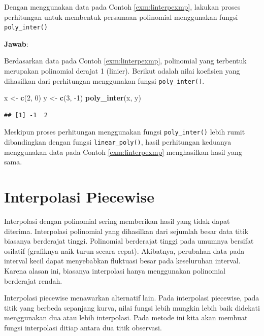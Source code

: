 \documentclass[]{book}
\newenvironment{Shaded}{\begin{snugshade}}{\end{snugshade}}
\newcommand{\DecValTok}[1]{\textcolor[rgb]{0.00,0.00,0.81}{#1}}
\newcommand{\KeywordTok}[1]{\textcolor[rgb]{0.13,0.29,0.53}{\textbf{#1}}}
\newcommand{\NormalTok}[1]{#1}
\newcommand{\StringTok}[1]{\textcolor[rgb]{0.31,0.60,0.02}{#1}}
\theoremstyle{definition}
\theoremstyle{definition}
\theoremstyle{definition}
\theoremstyle{remark}
\let\BeginKnitrBlock\begin \let\EndKnitrBlock\end
\begin{document}
\BeginKnitrBlock{example}
\protect\hypertarget{exm:hopoliexmp2}{}{\label{exm:hopoliexmp2} }Dengan menggunakan data pada Contoh \ref{exm:linterpexmp}, lakukan proses perhitungan untuk membentuk persamaan polinomial menggunakan fungsi \texttt{poly\_inter()}
\EndKnitrBlock{example}

\textbf{Jawab}:

Berdasarkan data pada Contoh \ref{exm:linterpexmp}, polinomial yang terbentuk merupakan polinomial derajat 1 (linier). Berikut adalah nilai koefisien yang dihasilkan dari perhitungan menggunakan fungsi \texttt{poly\_inter()}.

\begin{Shaded}
\begin{Highlighting}[]
\NormalTok{x <-}\StringTok{ }\KeywordTok{c}\NormalTok{(}\DecValTok{2}\NormalTok{, }\DecValTok{0}\NormalTok{)}
\NormalTok{y <-}\StringTok{ }\KeywordTok{c}\NormalTok{(}\DecValTok{3}\NormalTok{, }\DecValTok{-1}\NormalTok{)}
\KeywordTok{poly_inter}\NormalTok{(x, y)}
\end{Highlighting}
\end{Shaded}

\begin{verbatim}
## [1] -1  2
\end{verbatim}

Meskipun proses perhitungan menggunakan fungsi \texttt{poly\_inter()} lebih rumit dibandingkan dengan fungsi \texttt{linear\_poly()}, hasil perhitungan keduanya menggunakan data pada Contoh \ref{exm:linterpexmp} menghasilkan hasil yang sama.

\hypertarget{pwinter}{%
\section{Interpolasi Piecewise}\label{pwinter}}

Interpolasi dengan polinomial sering memberikan hasil yang tidak dapat diterima. Interpolasi polinomial yang dihasilkan dari sejumlah besar data titik biasanya berderajat tinggi. Polinomial berderajat tinggi pada umumnya bersifat osilatif (grafiknya naik turun secara cepat). Akibatnya, perubahan data pada interval kecil dapat menyebabkan fluktuasi besar pada keseluruhan interval. Karena alasan ini, biasanya interpolasi hanya menggunakan polinomial berderajat rendah.

Interpolasi piecewise menawarkan alternatif lain. Pada interpolasi piecewise, pada titik yang berbeda sepanjang kurva, nilai fungsi lebih mungkin lebih baik didekati menggunakan dua atau lebih interpolasi. Pada metode ini kita akan membuat fungsi interpolasi ditiap antara dua titik observasi.
\end{document}
